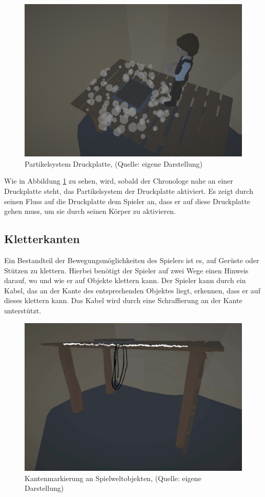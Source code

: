 \begin{figure}[ht]
\centering
\includegraphics[width=0.8\linewidth]{content/pictures/Pressureplate_tooltip.jpg}
\caption{Partikelsystem Druckplatte, (Quelle: eigene Darstellung)}
\label{fig:pressureplate_tooltip}
\end{figure}

Wie in Abbildung \ref{fig:pressureplate_tooltip} zu sehen, wird, sobald der Chronologe nahe an einer Druckplatte steht, das Partikelsystem der Druckplatte aktiviert. Es zeigt durch seinen Fluss auf die Druckplatte dem Spieler an, dass er auf diese Druckplatte gehen muss, um sie durch seinen Körper zu aktivieren.

\subsection{Kletterkanten}\label{sec:leadge}
Ein Bestandteil der Bewegungsmöglichkeiten des Spielers ist es, auf Gerüste oder Stützen zu klettern. Hierbei benötigt der Spieler auf zwei Wege einen Hinweis darauf, wo und wie er auf Objekte klettern kann.
Der Spieler kann durch ein Kabel, das an der Kante des entsprechenden Objektes liegt, erkennen, dass er auf dieses klettern kann. Das Kabel wird durch eine Schraffierung an der Kante unterstützt.

\begin{figure}[ht]
\centering
\includegraphics[width=0.8\linewidth]{content/pictures/leadge_wireframe.jpg}
\caption{Kantenmarkierung an Spielweltobjekten, (Quelle: eigene Darstellung)}
\label{fig:leadge}
\end{figure}

